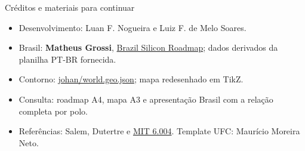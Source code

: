 \begin{frame}{Créditos e materiais para continuar}
\small\begin{itemize}
\item Desenvolvimento: Luan F. Nogueira e Luiz F. de Melo Soares.
\item Brasil: \textbf{Matheus Grossi}, \href{https://github.com/MattGrossi12/brazil_silicon_roadmap}{Brazil Silicon Roadmap}; dados derivados da planilha PT-BR fornecida.
\item Contorno: \href{https://github.com/johan/world.geo.json/blob/master/countries/BRA.geo.json}{johan/world.geo.json}; mapa redesenhado em TikZ.
\item Consulta: roadmap A4, mapa A3 e apresentação Brasil com a relação completa por polo.
\item Referências: Salem, Dutertre e \href{https://ocw.mit.edu/courses/6-004-computation-structures-spring-2017/}{MIT 6.004}. Template UFC: Maurício Moreira Neto.
\end{itemize}
\end{frame}

